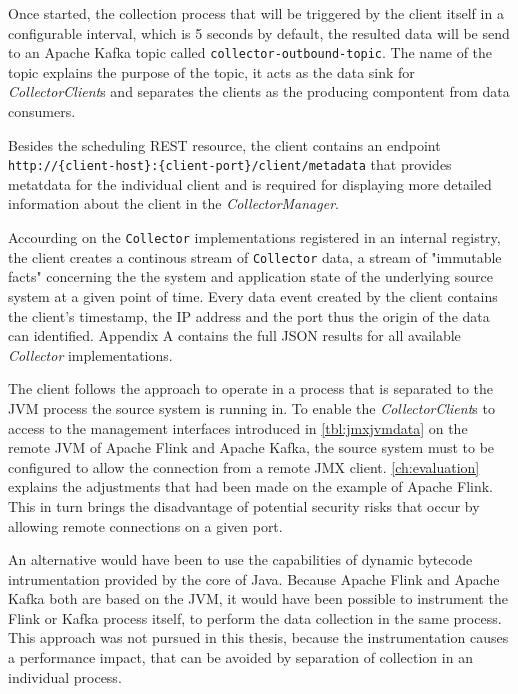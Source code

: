 Once started, the collection process that will be triggered by the client itself in a configurable interval, which is 5 seconds by default,
the resulted data will be send to an Apache Kafka topic called \verb|collector-outbound-topic|. The name of the topic explains the
purpose of the topic, it acts as the data sink for \textit{CollectorClient}s and separates the clients as the producing compontent
from data consumers.

Besides the scheduling REST resource, the client contains an endpoint \newline \verb|http://{client-host}:{client-port}/client/metadata|
that provides metatdata for the individual client and is required for displaying more detailed information about the client in the
\textit{CollectorManager}.

Accourding on the \verb|Collector| implementations registered in an internal registry, the client creates a continous stream
of \verb|Collector| data, a stream of "immutable facts" concerning the the system and application state of the underlying source
system at a given point of time. Every data event created by the client contains the client's timestamp, the IP address and the port thus the
origin of the data can identified. Appendix A contains the full JSON results for all available \textit{Collector} implementations.

The client follows the approach to operate in a process that is separated to the JVM process the source system is running in.
To enable the \textit{CollectorClient}s to access to the management interfaces introduced in \autoref{tbl:jmxjvmdata} on the remote JVM
of Apache Flink and Apache Kafka, the source system must to be configured to allow the connection from a remote JMX client. \autoref{ch:evaluation}
explains the adjustments that had been made on the example of Apache Flink. This in turn brings the disadvantage of potential
security risks that occur by allowing remote connections on a given port.

An alternative would have been to use the capabilities of dynamic bytecode intrumentation provided by the core of Java. Because
Apache Flink and Apache Kafka both are based on the JVM, it would have been possible to instrument the Flink or Kafka process itself,
to perform the data collection in the same process. This approach was not pursued in this thesis, because the instrumentation causes
a performance impact, that can be avoided by separation of collection in an individual process.


